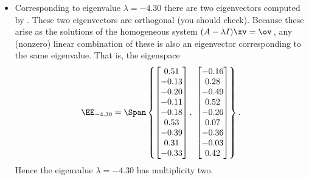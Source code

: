 \begin{example}
\begin{solution}
\begin{itemize}
\item Corresponding to eigenvalue \(\lambda=-4.30\) there are two eigenvectors computed by \script.
These two eigenvectors are orthogonal (you should check).
Because these arise as the solutions of the homogeneous system \((A-\lambda I)\xv=\ov\)\,, any (nonzero) linear combination of these is also an eigenvector corresponding to the same eigenvalue. 
That is, the eigenspace
\begin{equation*}
\EE_{-4.30}=\Span\left\{ \begin{bmatrix} 0.51\\-0.13\\-0.20\\-0.11\\-0.18\\0.53\\-0.39\\0.31\\-0.33 \end{bmatrix},\  \begin{bmatrix} -0.16\\0.28\\-0.49\\0.52\\-0.26\\0.07\\-0.36\\-0.03\\0.42 \end{bmatrix} \right\}.
\end{equation*}
Hence the eigenvalue \(\lambda=-4.30\) has multiplicity two.


\end{itemize}
\end{solution}
\end{example}
